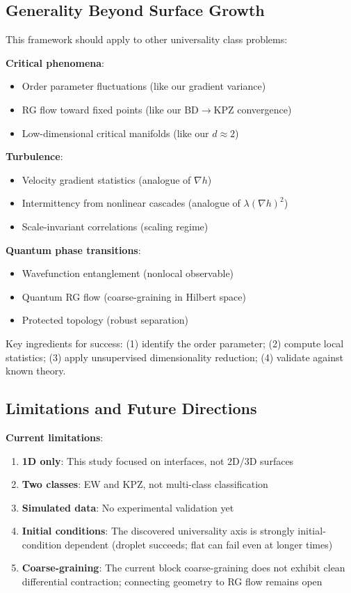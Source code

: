 \documentclass[aps,pre,twocolumn,superscriptaddress,showpacs]{revtex4-2}
\begin{document}
\subsection{Generality Beyond Surface Growth}

This framework should apply to other universality class problems:

\textbf{Critical phenomena}:
\begin{itemize}
\item Order parameter fluctuations (like our gradient variance)
\item RG flow toward fixed points (like our BD$\to$KPZ convergence)
\item Low-dimensional critical manifolds (like our $d \approx 2$)
\end{itemize}

\textbf{Turbulence}:
\begin{itemize}
\item Velocity gradient statistics (analogue of $\nabla h$)
\item Intermittency from nonlinear cascades (analogue of $\lambda(\nabla h)^2$)
\item Scale-invariant correlations (scaling regime)
\end{itemize}

\textbf{Quantum phase transitions}:
\begin{itemize}
\item Wavefunction entanglement (nonlocal observable)
\item Quantum RG flow (coarse-graining in Hilbert space)
\item Protected topology (robust separation)
\end{itemize}

Key ingredients for success: (1) identify the order parameter; (2) compute local statistics; (3) apply unsupervised dimensionality reduction; (4) validate against known theory.

\subsection{Limitations and Future Directions}

\textbf{Current limitations}:
\begin{enumerate}
\item \textbf{1D only}: This study focused on interfaces, not 2D/3D surfaces
\item \textbf{Two classes}: EW and KPZ, not multi-class classification
\item \textbf{Simulated data}: No experimental validation yet
\item \textbf{Initial conditions}: The discovered universality axis is strongly initial-condition dependent (droplet succeeds; flat can fail even at longer times)
\item \textbf{Coarse-graining}: The current block coarse-graining does not exhibit clean differential contraction; connecting geometry to RG flow remains open
\end{enumerate}
\end{document}
